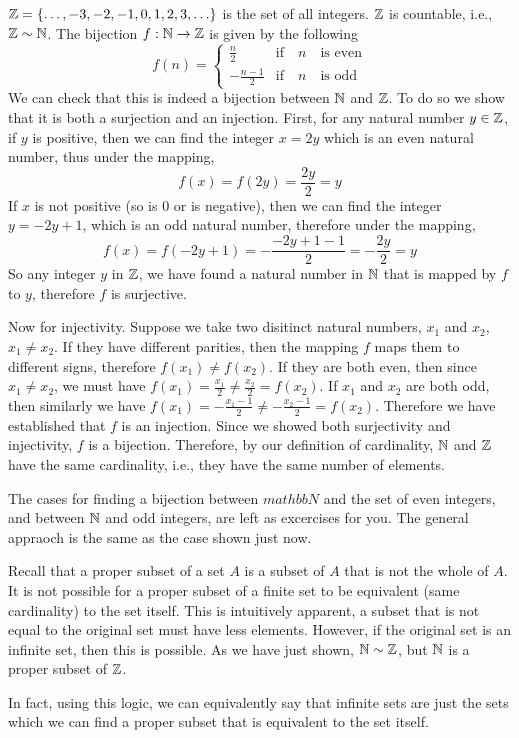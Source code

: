 \documentclass[../../templates/section]{subfiles}
\begin{document}
\begin{example}
$\mathbb{Z} = \{\ldots, -3, -2, -1, 0, 1, 2, 3, \ldots\}$ is the set of all integers.
$\mathbb{Z}$ is countable, i.e., $\mathbb{Z} \sim \mathbb{N}$. The bijection $f:\mathbb{N} \to \mathbb{Z}$ is
given by the following
\[ 
f(n) =
\begin{cases} 
    \frac{n}{2}      & \text{if} \quad n \quad \text{is even} \\
    -\frac{n - 1}{2} & \text{if} \quad n \quad \text{is odd}
\end{cases}
\]
We can check that this is indeed a bijection between $\mathbb{N}$ and $\mathbb{Z}$.  To do so
we show that it is both a surjection and an injection. First, for any natural
number $y\in \mathbb{Z}$, if $y$ is positive, then we can find the integer $x = 2y$
which is an even natural number, thus under the mapping,
\[
f(x) = f(2y) = \frac{2y}{2} = y
\]
If $x$ is not positive (so is 0 or is negative), then we can find the integer
$y = -2y + 1$, which is an odd natural number, therefore under the mapping,
\[
f(x) = f(-2y + 1) = -\frac{-2y + 1 - 1}{2} = -\frac{2y}{2} = y
\]
So any integer $y$ in $\mathbb{Z}$, we have found a natural number in $\mathbb{N}$ that is
mapped by $f$ to $y$, therefore $f$ is surjective.

Now for injectivity. Suppose we take two disitinct natural numbers, $x_1$ and
$x_2$, $x_1\neq x_2$. If they have different parities, then the mapping $f$
maps them to different signs, therefore $f(x_1)\neq f(x_2)$. If they are both
even, then since $x_1\neq x_2$, we must have $f(x_1) = \frac{x_1}{2}\neq
\frac{x_2}{2} = f(x_2)$. If $x_1$ and $x_2$ are both odd, then similarly we
have $f(x_1) = -\frac{x_1-1}{2}\neq -\frac{x_2-1}{2} = f(x_2)$. Therefore we
have established that $f$ is an injection. Since we showed both surjectivity
and injectivity, $f$ is a bijection. Therefore, by our definition of
cardinality, $\mathbb{N}$ and $\mathbb{Z}$ have the same cardinality, i.e., they have the same
number of elements.

The cases for finding a bijection between $mathbb{N}$ and the set of even
integers, and between $\mathbb{N}$ and odd integers, are left as excercises for you.
The general appraoch is the same as the case shown just now.
\end{example} 

\begin{remark}
Recall that a proper subset of a set $A$ is a subset of $A$ that is not the
whole of $A$.  It is not possible for a proper subset of a finite set to be
equivalent (same cardinality) to the set itself. This is intuitively apparent,
a subset that is not equal to the original set must have less elements.
However, if the original set is an infinite set, then this is possible. As we
have just shown, $\mathbb{N} \sim \mathbb{Z}$, but $\mathbb{N}$ is a proper subset of $\mathbb{Z}$.
\end{remark}
In fact, using this logic, we can equivalently say that infinite sets are 
just the sets which we can find a proper subset that is equivalent to the 
set itself.
\end{document}
